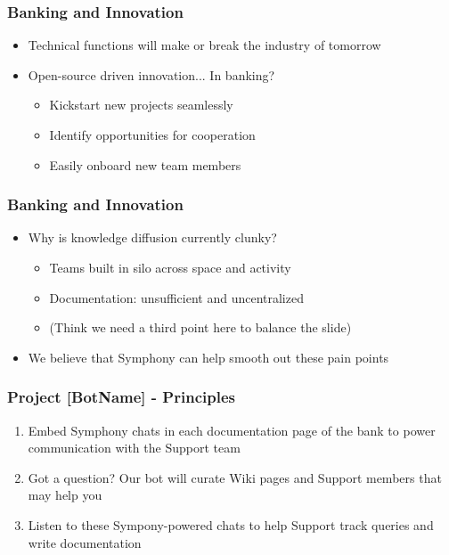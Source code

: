 \documentclass{beamer}
\begin{document}
\begin{frame}
\frametitle{Banking and Innovation}
\begin{itemize}
\item Technical functions will make or break the industry of tomorrow
\item Open-source driven innovation... In banking? %
\begin{itemize}
\item Kickstart new projects seamlessly
\item Identify opportunities for cooperation
\item Easily onboard new team members
\end{itemize}
\end{itemize}
\end{frame}

\begin{frame}
\frametitle{Banking and Innovation}
\begin{itemize}
\item Why is knowledge diffusion currently clunky?
\begin{itemize}
\item Teams built in silo across space and activity %
\item Documentation: unsufficient and uncentralized %
\item (Think we need a third point here to balance the slide)
\end{itemize}
\item We believe that Symphony can help smooth out these pain points
\end{itemize}
\end{frame}

\begin{frame}
\frametitle{Project [BotName] - Principles}
\begin{enumerate}
\item Embed Symphony chats in each documentation page of the bank to power communication with the Support team
\item Got a question? Our bot will curate Wiki pages and Support members that may help you
\item Listen to these Sympony-powered chats to help Support track queries and write documentation
\end{enumerate}
\end{frame}
\end{document}
